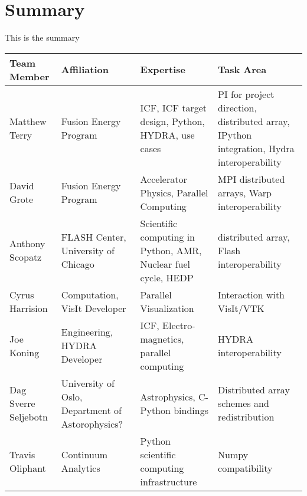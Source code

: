 \documentclass[a4paper]{article}
\newlength{\DUtablewidth} %
\begin{document}
\section*{Summary}

This is the summary


\setlength{\DUtablewidth}{\linewidth}
\begin{longtable*}[c]{|p{0.187\DUtablewidth}|p{0.251\DUtablewidth}|p{0.260\DUtablewidth}|p{0.251\DUtablewidth}|}
	\hline
	\textbf{Team Member} & \textbf{Affiliation} & \textbf{Expertise} & \textbf{Task Area} \\
	\hline
	\endfirsthead
	\hline

	Matthew Terry &
	Fusion Energy Program &
	ICF, ICF target design, Python, HYDRA, use cases &
	PI for project direction, distributed array, IPython integration, Hydra interoperability \\
	\hline

	David Grote &
	Fusion Energy Program &
	Accelerator Physics, Parallel Computing &
	MPI distributed arrays, Warp interoperability \\
	\hline

	Anthony Scopatz &
	FLASH Center, University of Chicago &
	Scientific computing in Python, AMR, Nuclear fuel cycle, HEDP &
	distributed array, Flash interoperability \\
	\hline

	Cyrus Harrision &
	Computation, VisIt Developer &
	Parallel Visualization &
	Interaction with VisIt/VTK  \\
	\hline

	Joe Koning &
	Engineering, HYDRA Developer & 
	ICF, Electro-magnetics, parallel computing & 
	HYDRA interoperability \\
	\hline

	Dag Sverre Seljebotn &
	University of Oslo, Department of Astorophysics? & 
	Astrophysics, C-Python bindings &
	Distributed array schemes and redistribution \\
	\hline

	Travis Oliphant &
	Continuum Analytics &
	Python scientific computing infrastructure &
	Numpy compatibility \\

	\hline
\end{longtable*}



\end{document}
